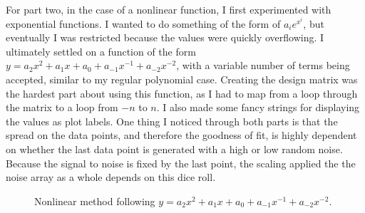 \documentclass[twocolumn,11pt]{article}
\begin{document}
For part two, in the case of a nonlinear function, I first experimented with exponential functions. I wanted to do something of the form of $a_ie^{x^i}$, but eventually I was restricted because the values were quickly overflowing. I ultimately settled on a function of the form $y=a_2x^2+a_1x+a_0+a_{-1}x^{-1}+a_{-2}x^{-2}$, with a variable number of terms being accepted, similar to my regular polynomial case. Creating the design matrix was the hardest part about using this function, as I had to map from a loop through the matrix to a loop from $-n$ to $n$. I also made some fancy strings for displaying the values as plot labels. One thing I noticed through both parts is that the spread on the data points, and therefore the goodness of fit, is highly dependent on whether the last data point is generated with a high or low random noise. Because the signal to noise is fixed by the last point, the scaling applied the the noise array as a whole depends on this dice roll.

\begin{figure}[!h]
	\centering
	\noindent
      \caption{Nonlinear method following $y=a_2x^2+a_1x+a_0+a_{-1}x^{-1}+a_{-2}x^{-2}$.}
\end{figure}
\end{document}
